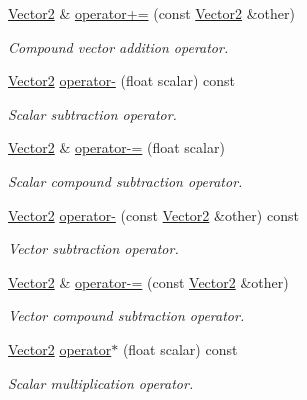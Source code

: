 \begin{DoxyCompactItemize}
\hyperlink{classchaos_1_1gfx_1_1_vector2}{Vector2} \& \hyperlink{classchaos_1_1gfx_1_1_vector2_abf94321f81a0598b1ee8a8119e1e7ae3}{operator+=} (const \hyperlink{classchaos_1_1gfx_1_1_vector2}{Vector2} \&other)
\begin{DoxyCompactList}\small\item\em Compound vector addition operator. \end{DoxyCompactList}\item 
\hyperlink{classchaos_1_1gfx_1_1_vector2}{Vector2} \hyperlink{classchaos_1_1gfx_1_1_vector2_a0f4f7749c5841b8ff46b5b60c1114863}{operator-\/} (float scalar) const 
\begin{DoxyCompactList}\small\item\em Scalar subtraction operator. \end{DoxyCompactList}\item 
\hyperlink{classchaos_1_1gfx_1_1_vector2}{Vector2} \& \hyperlink{classchaos_1_1gfx_1_1_vector2_ab9c69ad11e706040bf115e9c937b998f}{operator-\/=} (float scalar)
\begin{DoxyCompactList}\small\item\em Scalar compound subtraction operator. \end{DoxyCompactList}\item 
\hyperlink{classchaos_1_1gfx_1_1_vector2}{Vector2} \hyperlink{classchaos_1_1gfx_1_1_vector2_a5054c54e89586fdf158a5bc82ae3bb7f}{operator-\/} (const \hyperlink{classchaos_1_1gfx_1_1_vector2}{Vector2} \&other) const 
\begin{DoxyCompactList}\small\item\em Vector subtraction operator. \end{DoxyCompactList}\item 
\hyperlink{classchaos_1_1gfx_1_1_vector2}{Vector2} \& \hyperlink{classchaos_1_1gfx_1_1_vector2_a178eea30bced3cff00348c030ee0c105}{operator-\/=} (const \hyperlink{classchaos_1_1gfx_1_1_vector2}{Vector2} \&other)
\begin{DoxyCompactList}\small\item\em Vector compound subtraction operator. \end{DoxyCompactList}\item 
\hyperlink{classchaos_1_1gfx_1_1_vector2}{Vector2} \hyperlink{classchaos_1_1gfx_1_1_vector2_a3a082c7e2592573a665f3614af5ecd92}{operator$\ast$} (float scalar) const 
\begin{DoxyCompactList}\small\item\em Scalar multiplication operator. \end{DoxyCompactList}\item 

\end{DoxyCompactItemize}
